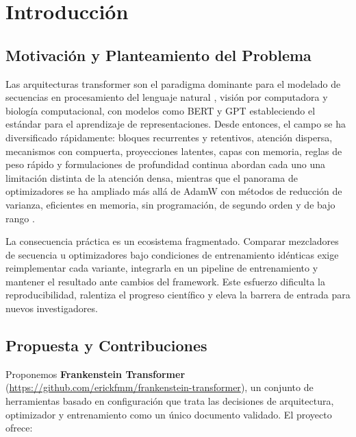 \section{Introducción}

\subsection{Motivación y Planteamiento del Problema}

Las arquitecturas transformer son el paradigma dominante para el modelado de secuencias en procesamiento del lenguaje natural \citep{vaswani_attention_2017}, visión por computadora y biología computacional, con modelos como BERT \citep{devlin_bert_2019} y GPT estableciendo el estándar para el aprendizaje de representaciones. Desde entonces, el campo se ha diversificado rápidamente: bloques recurrentes y retentivos, atención dispersa, mecanismos con compuerta, proyecciones latentes, capas con memoria, reglas de peso rápido y formulaciones de profundidad continua abordan cada uno una limitación distinta de la atención densa, mientras que el panorama de optimizadores se ha ampliado más allá de AdamW con métodos de reducción de varianza, eficientes en memoria, sin programación, de segundo orden y de bajo rango \citep{child_sparse_transformer_2019,sun_retentive_2023,gu_mamba_2023,behrouz_titans_2025,ramapuram_theory_2024,xie_adan_2022,pagliardini_ademamix_2024,yuan_mars_2024,shazeer_adafactor_2018,zhao_galore_2024,defazio_road_2024,gupta_shampoo_2018,vyas_soap_2024}.

La consecuencia práctica es un ecosistema fragmentado. Comparar mezcladores de secuencia u optimizadores bajo condiciones de entrenamiento idénticas exige reimplementar cada variante, integrarla en un pipeline de entrenamiento y mantener el resultado ante cambios del framework. Este esfuerzo dificulta la reproducibilidad, ralentiza el progreso científico y eleva la barrera de entrada para nuevos investigadores.

\subsection{Propuesta y Contribuciones}

Proponemos \textbf{Frankenstein Transformer} (\url{https://github.com/erickfmm/frankenstein-transformer}), un conjunto de herramientas basado en configuración que trata las decisiones de arquitectura, optimizador y entrenamiento como un único documento validado. El proyecto ofrece:

